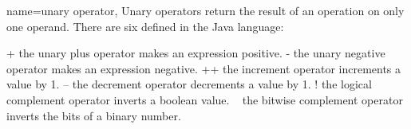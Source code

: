 {
     name=unary operator,
     Unary operators return the result of an operation on only one operand. There are six defined in the Java language:

 +    the unary plus operator makes an expression positive. -    the unary negative operator makes an expression negative. ++   the increment operator increments a value by 1. --   the decrement operator decrements a value by 1. !    the logical complement operator inverts a boolean value. ~    the bitwise complement operator inverts the bits of a binary number.
 }
